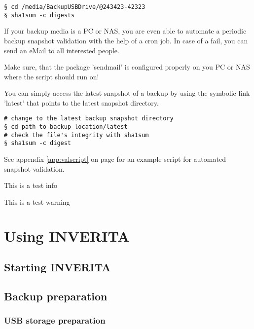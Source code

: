 \begin{lstlisting}[style=console]
§ cd /media/BackupUSBDrive/@243423-42323
§ sha1sum -c digests
\end{lstlisting}

If your backup media is a PC or NAS, you are even able to automate a periodic
backup snapshot validation with the help of a cron job. In case of a fail,
you can send an eMail to all interested people.

Make sure, that the package 'sendmail' is configured properly on you PC or NAS
where the script should run on!

\begin{info}
You can simply access the latest snapshot of a backup by using the
symbolic link 'latest' that points to the latest snapshot directory.
\end{info}

\begin{lstlisting}[style=console]
# change to the latest backup snapshot directory
§ cd path_to_backup_location/latest   
# check the file's integrity with sha1sum
§ sha1sum -c digest
\end{lstlisting}

See appendix \ref{app:valscript} on page \pageref{app:fdl} for an example script for automated
snapshot validation.


\begin{info}
This is a test info
\end{info}

\begin{warning}
This is a test warning
\end{warning}

\chapter{Using INVERITA}

\section{Starting INVERITA}

\section{Backup preparation}
\subsection{USB storage preparation}
